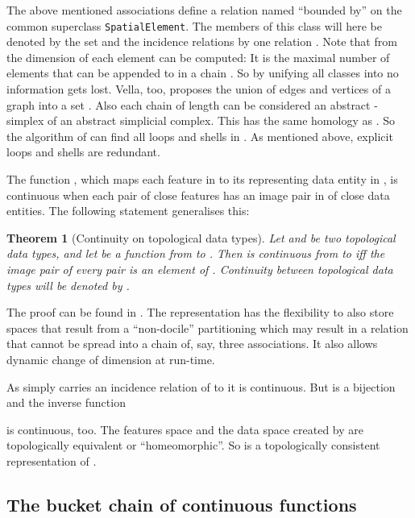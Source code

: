\documentclass[5p]{elsarticle}
\newtheorem{theorem}{Theorem}
\newcommand{\qq}[1]{``#1''}
\begin{document}
The above mentioned associations define a relation named 
\qq{bounded by} on the common superclass 
\texttt{Spa\-tial\-Ele\-ment}. The members of this class will here be denoted by the set  
and the incidence relations by one relation . 
Note that from  the dimension of each element 
 can be computed: 
It is the maximal number  of elements  
that can be appended to  in a chain . 
So by unifying all classes into  no information gets lost. 
Vella, too, proposes the union of edges and vertices of a graph into a set 
 \cite{Vella:GraphTheoryIsTopology}. 
Also each chain  of length  can be considered an abstract 
-simplex  of an abstract simplicial complex. This has the 
same homology as . So the algorithm of \cite{Boltcheva:Homology} can find 
all loops and shells in . As mentioned above, explicit loops and shells are 
redundant. 

The function , which maps each 
feature in  to its representing data entity in , is continuous when each pair 
 of close features has an image pair  in  of 
close data entities. The following statement generalises this:

\begin{sloppy} \begin{theorem}[Continuity on topological data types]
Let  and  be two topological data types, and let  be a function 
from  to . Then  is continuous from  to  
iff the image pair  of every pair  is an element of 
. 
Continuity between topological data types will be denoted by .
\end{theorem}
\end{sloppy} 

The proof can be found in \cite[Thm.\ 5.6]{BradleyPaul}. 
The representation  has the flexibility to also store spaces that result from a 
\qq{non-docile} partitioning which may result in a relation  that cannot be spread into a 
chain of, say, three associations. It also allows dynamic change of dimension at run-time.

As  simply carries an incidence relation  of  to 
 it is continuous. 
But  is a bijection and the inverse function 
 
is continuous, too. 
The features space  and the data space  
created by  are topologically 
equi\-valent or \qq{homeomorphic}. So  is a topologically 
consistent representation of .


\subsection{The bucket chain of continuous functions}
\end{document}
